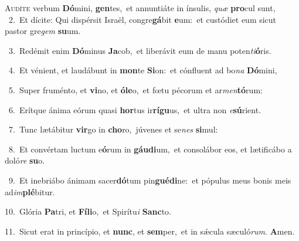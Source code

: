 \lettrine{\initial\textcolor{\initialcolor}{A}}{udíte} verbum \textbf{Dó}\-mini, \textbf{gen}\-tes,~\star et annuntiáte in ínsulis, \textit{quæ} \textbf{pro}\-cul sunt,\\
{\numbfont\textcolor{\numbcolor}{~2.}}~Et dícite: Qui dispérsit Israël, congre\-\textbf{gá}\-bit \textbf{e}\-um:~\star et custódiet eum sicut pastor gre\textit{gem} \textbf{su}\-um.\par
{\numbfont\textcolor{\numbcolor}{~3.}}~Redémit enim \textbf{Dó}\-minus \textbf{Ja}\-cob,~\star et liberávit eum de manu poten\-\textit{ti}\-\textbf{ó}ris.\par
{\numbfont\textcolor{\numbcolor}{~4.}}~Et vénient, et laudábunt in \textbf{mon}\-te \textbf{Si}\-on:~\star et cónfluent ad bo\textit{na} \textbf{Dó}\-mini,\par
{\numbfont\textcolor{\numbcolor}{~5.}}~Super fruménto, et \textbf{vi}\-no, et \textbf{ó}\-\textbf{le}o,~\star et fœtu pécorum et ar\-\textit{men}\-\textbf{tó}rum:\par
{\numbfont\textcolor{\numbcolor}{~6.}}~Erítque ánima eórum quasi \textbf{hor}\-tus ir\-\textbf{rí}\-\textbf{gu}us,~\star et ultra non \textit{e}\-\textbf{sú}rient.\par
{\numbfont\textcolor{\numbcolor}{~7.}}~Tunc lætábitur \textbf{vir}\-go in \textbf{cho}\-ro,~\star júvenes et se\textit{nes} \textbf{si}\-mul:\par
{\numbfont\textcolor{\numbcolor}{~8.}}~Et convértam luctum e\-\textbf{ó}\-rum in \textbf{gáu}\-\textbf{di}um,~\star et consolábor eos, et lætificábo a doló\textit{re} \textbf{su}\-o.\par
{\numbfont\textcolor{\numbcolor}{~9.}}~Et inebriábo ánimam sacer\-\textbf{dó}\-tum pin\-\textbf{gué}\-\textbf{di}ne:~\star et pópulus meus bonis meis ad\-\textit{im}\-\textbf{plé}bitur.\par
{\numbfont\textcolor{\numbcolor}{10.}}~Glória \textbf{Pa}\-tri, et \textbf{Fí}\-\textbf{li}o,~\star et Spirítu\textit{i} \textbf{Sanc}\-to.\par
{\numbfont\textcolor{\numbcolor}{11.}}~Sicut erat in princípio, et \textbf{nunc}\-, et \textbf{sem}\-per,~\star et in sǽcula sæculó\-\textit{rum}\-. \textbf{A}\-men.\par
